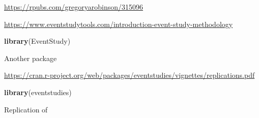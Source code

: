 \documentclass[
]{book}
\newenvironment{Shaded}{\begin{snugshade}}{\end{snugshade}}
\newcommand{\KeywordTok}[1]{\textcolor[rgb]{0.13,0.29,0.53}{\textbf{#1}}}
\newcommand{\NormalTok}[1]{#1}
\begin{document}
\url{https://rpubs.com/gregoryarobinson/315096}

\url{https://www.eventstudytools.com/introduction-event-study-methodology}

\begin{Shaded}
\begin{Highlighting}[]
\KeywordTok{library}\NormalTok{(EventStudy)}
\end{Highlighting}
\end{Shaded}

Another package

\url{https://cran.r-project.org/web/packages/eventstudies/vignettes/replications.pdf}

\begin{Shaded}
\begin{Highlighting}[]
\KeywordTok{library}\NormalTok{(eventstudies)}
\end{Highlighting}
\end{Shaded}

Replication of \citep{Chen_2004}
\end{document}
